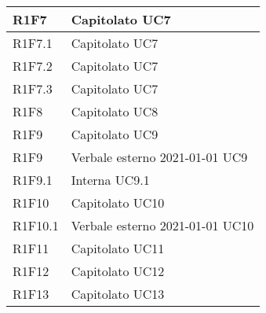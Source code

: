 \begin{center}
\begin{longtable}{|p{22mm}|p{22mm}|}
R1F7 &
Capitolato \newline
UC7 \newline
\\
\hline

R1F7.1 &
Capitolato \newline
UC7 \newline
\\
\hline

R1F7.2 &
Capitolato \newline
UC7 \newline
\\
\hline

R1F7.3 &
Capitolato \newline
UC7 \newline
\\
\hline

R1F8 &
Capitolato \newline
UC8 \newline
\\
\hline

R1F9 &
Capitolato \newline
UC9 \newline
\\
\hline

R1F9 &
Verbale esterno 2021-01-01 \newline
UC9 \newline
\\
\hline

R1F9.1 &
Interna \newline
UC9.1 \newline
\\
\hline

R1F10 &
Capitolato \newline
UC10 \newline
\\
\hline

R1F10.1 &
Verbale esterno 2021-01-01 \newline
UC10 \newline
\\
\hline

R1F11 &
Capitolato \newline
UC11 \newline
\\
\hline

R1F12 &
Capitolato \newline
UC12 \newline
\\
\hline

R1F13 &
Capitolato \newline
UC13 \newline
\\
\hline


\end{longtable}
\end{center}
